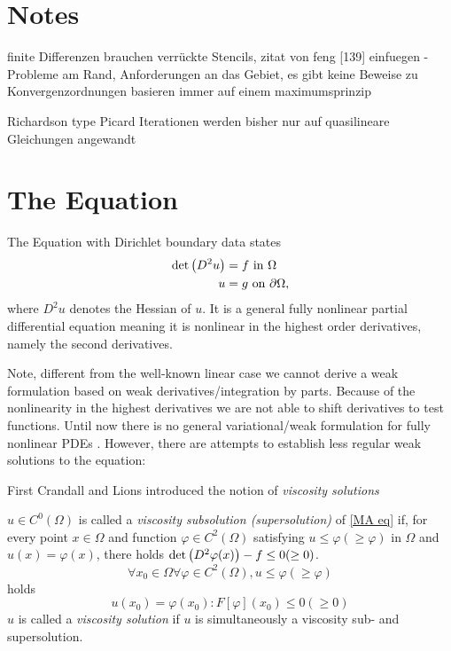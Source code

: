 \section{Notes}
finite Differenzen brauchen verrückte Stencils, zitat von feng [139] einfuegen - Probleme am Rand, Anforderungen an das Gebiet, es gibt keine Beweise zu Konvergenzordnungen
basieren immer auf einem maximumsprinzip

Richardson type Picard Iterationen werden bisher nur auf quasilineare Gleichungen angewandt


\section{The \MA Equation}

The \MA Equation with Dirichlet boundary data states
\begin{align}
	 \det{\left(D^2 u\right)} &= f \textnormal{ in } \Omega \label{MA eq}\\
	 u & = g \textnormal{ on } \partial \Omega,
\end{align}
where $D^2 u$ denotes the Hessian of $u$.
It is a general fully nonlinear partial differential equation meaning it is nonlinear in the highest order derivatives, namely the second derivatives.

Note, different from the well-known linear case we cannot derive a weak formulation based on weak derivatives/integration by parts. Because of the nonlinearity in the highest derivatives we are not able to shift derivatives to test functions. Until now there is no general variational/weak formulation for fully nonlinear PDEs \cite{FGN2013}.
However, there are attempts to establish less regular weak solutions to the \MA equation:

First Crandall and Lions \cite{58} introduced the notion of \emph{viscosity solutions}
\begin{definition}
	$u \in C^0(\Omega)$ is called a \emph{viscosity subsolution (supersolution)} of \eqref{MA eq} if, for every point $x \in \Omega$ and function $\varphi \in C^2(\Omega)$ satisfying $u \leq \varphi (\geq \varphi)$ in $\Omega$ and $u(x) = \varphi(x)$, there holds $\det{\left(D^2 \varphi(x)\right)} - f \leq 0 (\geq 0)$. 
	\[
	\forall x_0 \in \Omega \forall \varphi \in C^2(\Omega), u \leq \varphi (\geq \varphi)
	\] holds
	\[
	u(x_0) = \varphi(x_0) : F[\varphi](x_0) \leq 0 (\geq 0)
	\]
	$u$ is called a \emph{viscosity solution} if $u$ is simultaneously a viscosity sub- and supersolution.
\end{definition}

